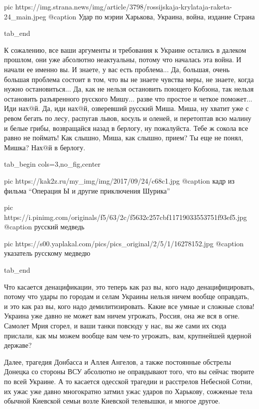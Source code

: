 		 pic https://img.strana.news/img/article/3798/rossijskaja-krylataja-raketa-24_main.jpeg
		 @caption Удар по мэрии Харькова, Украина, война, издание Страна

  tab_end
\fi

К сожалению, все ваши аргументы и требования к Украине остались в далеком
прошлом, они уже абсолютно неактуальны, потому что началась эта война. И начали
ее именно вы. И знаете, у вас есть проблема... Да, большая, очень большая
проблема состоит в том, что вы не знаете чувства меры, не знаете, когда нужно
остановиться... Да, как не нельзя остановить поющего Кобзона, так нельзя
остановить разъяренного русского Мишу...  разве что простое и четкое поможет...
Иди нах@й. Да, иди нах@й, озверевший русский Миша. Миша, ну хватит уже с ревом
бегать по лесу, распугав львов, косуль и оленей, и перетоптав всю малину и
белые грибы, возвращайся назад в берлогу, ну пожалуйста. Тебе ж сокола все
равно не поймать! Как слышно, Миша, как слышно, прием? Ты еще не понял, Мишка?
Нах@й в берлогу.

\ifcmt
  tab_begin cols=3,no_fig,center

     pic https://kak2z.ru/my_img/img/2017/09/24/c68c1.jpg
		 @caption кадр из фильма \enquote{Операция Ы и другие приключения Шурика}

		 pic https://i.pinimg.com/originals/f5/63/2c/f5632c257cbf11719033553751f93ef5.jpg
		 @caption русский медведь

		 pic https://s00.yaplakal.com/pics/pics_original/2/5/1/16278152.jpg
		 @caption указатель русскому медведю

  tab_end
\fi

Что касается денацификации, это теперь как раз вы, кого надо денацифицировать,
потому что удары по городам и селам Украины нельзя ничем вообще оправдать, и
это как раз вы, кого надо демилитизировать. Какие все умные и сложные слова!
Украина уже давно не может вам ничем угрожать, Россия, она же вся в огне.
Самолет Мрия сгорел, и ваши танки повсюду у нас, вы же сами их сюда прислали,
как мы можем вообще вам чем-то угрожать, вам, крупнейшей ядерной державе?

Далее, трагедия Донбасса и Аллея Ангелов, а также постоянные обстрелы Донецка
со стороны ВСУ абсолютно не оправдывают того, что вы сейчас творите по всей
Украине. А то касается одесской трагедии и расстрелов Небесной Сотни, их ужас
уже давно многократно затмил ужас ударов по Харькову, сожженые тела обычной
Киевской семьи возле Киевской телевышки, и многое другое.
